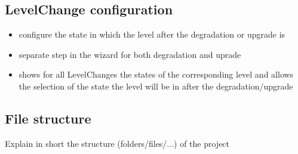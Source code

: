 \subsection{LevelChange configuration}
\begin{itemize}
    \item configure the state in which the level after the degradation or upgrade is
    \item separate step in the wizard for both degradation and uprade
    \item shows for all LevelChanges the states of the corresponding level and allows the selection of the state the level will be in after the degradation/upgrade 
\end{itemize}

\subsection{File structure}
Explain in short the structure (folders/files/...) of the project
